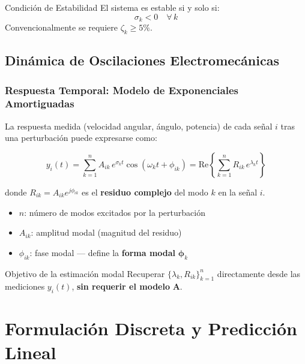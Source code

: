 \begin{alertblock}{Condición de Estabilidad}
    El sistema es estable si y solo si:
    \begin{equation}
        \sigma_k < 0 \quad \forall\, k
        \label{eq:stability}
    \end{equation}
    Convencionalmente se requiere $\zeta_k \geq 5\%$.
\end{alertblock}


\subsection{Dinámica de Oscilaciones Electromecánicas}
\subsubsection{Respuesta Temporal: Modelo de Exponenciales Amortiguadas}

La respuesta medida (velocidad angular, ángulo, potencia) de cada señal $i$ tras una perturbación puede expresarse como:

\begin{equation}
    y_i(t) = \sum_{k=1}^{n} A_{ik}\, e^{\sigma_k t}\cos(\omega_k t + \phi_{ik})
           = \mathrm{Re}\!\left\{\sum_{k=1}^{n} R_{ik}\, e^{\lambda_k t}\right\}
    \label{eq:response}
\end{equation}

donde $R_{ik} = A_{ik}e^{j\phi_{ik}}$ es el \textbf{residuo complejo} del modo $k$ en la señal $i$.

\begin{itemize}
    \item $n$: número de modos excitados por la perturbación
    \item $A_{ik}$: amplitud modal (magnitud del residuo)
    \item $\phi_{ik}$: fase modal — define la \textbf{forma modal} $\bm{\phi}_k$
\end{itemize}

    \begin{exampleblock}{Objetivo de la estimación modal}
    Recuperar $\{\lambda_k, R_{ik}\}_{k=1}^n$ directamente desde las mediciones $y_i(t)$,\textbf{ sin requerir el modelo} $\mathbf{A}$.
\end{exampleblock}

\section{Formulación Discreta y Predicción Lineal}

